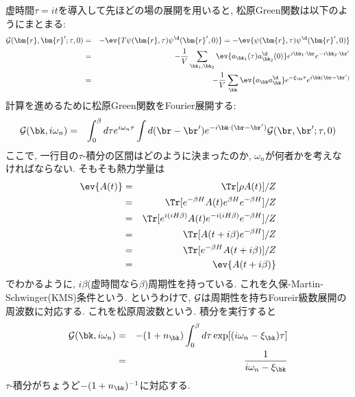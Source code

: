 \documentclass[10.5pt,a4paper]{jreport}
\begin{document}
虚時間$\tau = it$を導入して先ほどの場の展開を用いると, 松原Green関数は以下のようにまとまる:
\begin{eqnarray}
  {\cal G}(\bm{r}, \bm{r}'; \tau, 0) &=& -\ev{T\psi(\bm{r}, \tau)\psi^\d(\bm{r}', 0)} = -\ev{\psi(\bm{r}, \tau)\psi^\d(\bm{r}', 0)}\\
  &=& -\frac{1}{V}\sum_{{\bk}_1, {\bk}_2}\ev{a_{{\bk}_1}(\tau)a^\d_{\bk_2}(0)}e^{i\bk_1\cdot\br}e^{-i\bk_2\cdot\br'}\\
  &=&-\frac{1}{V}\sum_{\bk}\ev{a_{\bk}a^\d_{\bk}}e^{-\xi_{\bk}\tau}e^{i\bk(\br - \br')}
\end{eqnarray}
計算を進めるために松原Green関数をFourier展開する:
\begin{eqnarray}
  {\cal G}(\bk, i\omega_n) &=& \int_0^\beta d\tau e^{i\omega_n\tau}\int d(\br-\br')e^{-i\bk\cdot(\br-\br')}{\cal G}(\br, \br';\tau, 0)
\end{eqnarray}
ここで, 一行目の$\tau$-積分の区間はどのように決まったのか, $\omega_n$が何者かを考えなければならない. そもそも熱力学量は
\begin{eqnarray}
  \ev{A(t)} &=& \Tr[\rho A(t)]/Z\\
  &=& \Tr[e^{-\beta H} A(t)e^{\beta H}e^{-\beta H}]/Z\\
  &=& \Tr[e^{i(iH\beta)} A(t)e^{-i(iH\beta)}e^{-\beta H}]/Z\\
  &=& \Tr[A(t+i\beta)e^{-\beta H}]/Z\\
  &=& \Tr[e^{-\beta H}A(t+i\beta)]/Z\\
  &=& \ev{A(t+i\beta)}
\end{eqnarray}
でわかるように, $i\beta$(虚時間なら$\beta$)周期性を持っている. これを久保-Martin-Schwinger(KMS)条件という. というわけで, ${\cal G}$は周期性を持ちFoureir級数展開の周波数に対応する. これを松原周波数という. 積分を実行すると
\begin{eqnarray}
  {\cal G}(\bk, i\omega_n) &=& -(1 + n_{\bk})\int_0^\beta d\tau \exp[(i\omega_n - \xi_{\bk})\tau]\\
  &=& \frac{1}{i\omega_n-\xi_{\bk}}
\end{eqnarray}
$\tau$-積分がちょうど$-(1+n_{\bk})^{-1}$に対応する.
\end{document}
